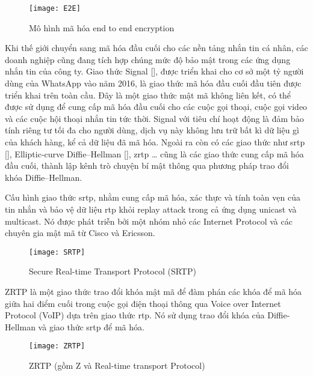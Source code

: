 \documentclass[../main-report.tex]{subfiles}
\begin{document}
\begin{figure}[ht!]
\begin{center}
\label{fig:E2E}
\texttt{[image: E2E]}
\caption{Mô hình mã hóa end to end encryption}
\end{center}
\end{figure}

Khi thế giới chuyển sang mã hóa đầu cuối cho các nền tảng nhắn tin cá nhân, các doanh nghiệp cũng đang tích hợp chúng mức độ bảo mật trong các ứng dụng nhắn tin của công ty. Giao thức Signal [\cite{1}], được triển khai cho cơ sở một tỷ người dùng của WhatsApp vào năm 2016, là giao thức mã hóa đầu cuối đầu tiên được triển khai trên toàn cầu. Đây là một giao thức mật mã không liên kết, có thể được sử dụng để cung cấp mã hóa đầu cuối cho các cuộc gọi thoại, cuộc gọi video và các cuộc hội thoại nhắn tin tức thời. Signal với tiêu chí hoạt động là đảm bảo tính riêng tư tối đa cho người dùng, dịch vụ này không lưu trữ bất kì dữ liệu gì của khách hàng, kể cả dữ liệu đã mã hóa. Ngoài ra còn có các giao thức như \acrfull{srtp} [\cite{2}], Elliptic-curve Diffie–Hellman [\cite{3}], \acrfull{zrtp} … cũng là các giao thức cung cấp mã hóa đầu cuối, thành lập kênh trò chuyện bí mật thông qua phương pháp trao đổi khóa Diffie–Hellman.

Cấu hình giao thức \acrfull{srtp}, nhằm cung cấp mã hóa, xác thực và tính toàn vẹn của tin nhắn và bảo vệ dữ liệu \acrshort{rtp} khỏi \gls{replay attack} trong cả ứng dụng unicast và multicast. Nó được phát triễn bởi một nhóm nhỏ các \gls{Internet Protocol} và các chuyên gia mật mã từ Cisco và Ericsson.


\begin{figure}[ht!]
\begin{center}
\label{fig:SRTP}
\texttt{[image: SRTP]}
\caption{Secure Real-time Transport Protocol (SRTP)}
\end{center}
\end{figure}

ZRTP là một giao thức trao đổi khóa mật mã để đàm phán các khóa để mã hóa giữa hai điểm cuối trong cuộc gọi điện thoại thông qua Voice over \gls{Internet Protocol} (VoIP) dựa trên giao thức \acrfull{rtp}. Nó sử dụng trao đổi khóa của Diffie-Hellman và giao thức \acrshort{srtp} để mã hóa.

\begin{figure}[ht!]
\begin{center}
\label{fig:ZRTP}
\texttt{[image: ZRTP]}
\caption{ZRTP (gồm Z và Real-time transport Protocol)}
\end{center}
\end{figure}
\end{document}
